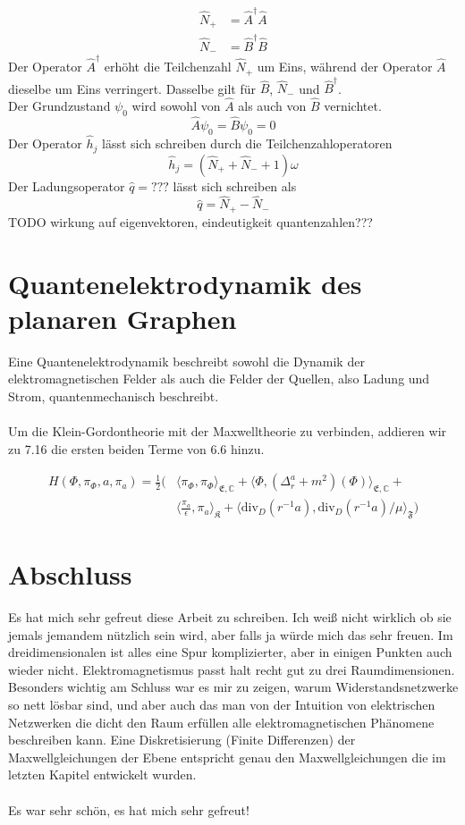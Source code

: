 \documentclass[11pt,a4paper,leqno]{report}
\numberwithin{equation}{chapter}
\begin{document}
\begin{align*}
	\hat{N}_+ &= \hat{A}^\dagger \hat{A}\\
	\hat{N}_- &= \hat{B}^\dagger \hat{B}
\end{align*}
Der Operator $\hat{A}^\dagger$ erh\"oht die Teilchenzahl $\hat{N}_+$ um Eins, während der Operator $\hat{A}$ dieselbe um Eins verringert. Dasselbe gilt f\"ur $\hat{B}$, $\hat{N}_-$ und $\hat{B}^\dagger$.\\
Der Grundzustand $\psi_0$ wird sowohl von $\hat{A}$ als auch von $\hat{B}$ vernichtet. 
\begin{equation*}
	\hat{A}\psi_0 = \hat{B}\psi_0 = 0
\end{equation*}
Der Operator $\hat{h}_j$ l\"asst sich schreiben durch die Teilchenzahloperatoren
\begin{equation*}
	\hat{h}_j = (\hat{N}_+ +\hat{N}_- + 1)\omega
\end{equation*}
Der Ladungsoperator $\hat{q} = ???$ l\"asst sich schreiben als 
\begin{equation*}
	\hat{q} = \hat{N}_+ -\hat{N}_- 
\end{equation*}
TODO wirkung auf eigenvektoren, eindeutigkeit quantenzahlen???
\chapter{Quantenelektrodynamik des planaren Graphen}
Eine Quantenelektrodynamik beschreibt sowohl die Dynamik der elektromagnetischen Felder als auch die Felder der Quellen, also Ladung und Strom, quantenmechanisch beschreibt.\\
\\ 
Um die Klein-Gordontheorie mit der Maxwelltheorie zu verbinden, addieren wir zu 7.16 die ersten beiden Terme von 6.6 hinzu.

\begin{align*}
	H(\Phi, \pi_\Phi, a, \pi_a) = \frac{1}{2}(&\langle \pi_\Phi, \pi_\Phi\rangle_{\mathfrak{E},\mathbb{C}}+\langle \Phi, (\Delta_r^a + m^2)(\Phi)\rangle_{\mathfrak{E},\mathbb{C}}+\\ &\langle \frac{\pi_a}{\epsilon}, \pi_a\rangle_{\mathfrak{K}} + \langle \text{div}_D(r^{-1}a), \text{div}_D(r^{-1}a)/\mu\rangle_{\mathfrak{F}}) 
\end{align*}	
\chapter*{Abschluss}
Es hat mich sehr gefreut diese Arbeit zu schreiben. Ich wei\ss{} nicht wirklich ob sie jemals jemandem n\"utzlich sein wird, aber falls ja w\"urde mich das sehr freuen. Im dreidimensionalen ist alles eine Spur komplizierter, aber in einigen Punkten auch wieder nicht. Elektromagnetismus passt halt recht gut zu drei Raumdimensionen. Besonders wichtig am Schluss war es mir zu zeigen, warum Widerstandsnetzwerke so nett l\"osbar sind, und aber auch das man von der Intuition von elektrischen Netzwerken die dicht den Raum erf\"ullen alle elektromagnetischen Ph\"anomene beschreiben kann. Eine Diskretisierung (Finite Differenzen) der Maxwellgleichungen der Ebene entspricht genau den Maxwellgleichungen die im letzten Kapitel entwickelt wurden. \\
\\
Es war sehr sch\"on, es hat mich sehr gefreut!
\end{document}
